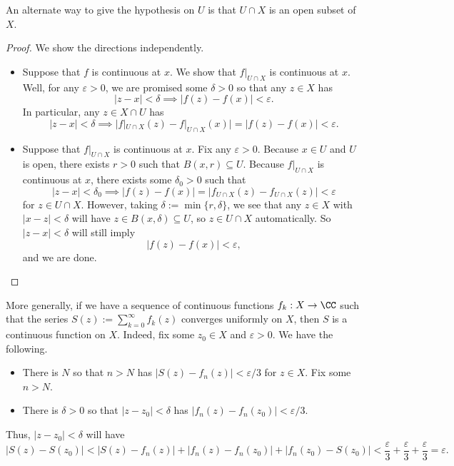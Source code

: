 An alternate way to give the hypothesis on $U$ is that $U\cap X$ is an open subset of $X$.
\begin{proof}
	We show the directions independently.
	\begin{itemize}
		\item Suppose that $f$ is continuous at $x$. We show that $f|_{U\cap X}$ is continuous at $x$. Well, for any $\varepsilon>0$, we are promised some $\delta>0$ so that any $z\in X$ has
		\[|z-x|<\delta\implies|f(z)-f(x)|<\varepsilon.\]
		In particular, any $z\in X\cap U$ has
		\[|z-x|<\delta\implies\big|f|_{U\cap X}(z)-f|_{U\cap X}(x)\big|=|f(z)-f(x)|<\varepsilon.\]
		\item Suppose that $f|_{U\cap X}$ is continuous at $x$. Fix any $\varepsilon>0$. Because $x\in U$ and $U$ is open, there exists $r>0$ such that $B(x,r)\subseteq U$. Because $f|_{U\cap X}$ is continuous at $x$, there exists some $\delta_0>0$ such that
		\[|z-x|<\delta_0\implies|f(z)-f(x)|=|f_{U\cap X}(z)-f_{U\cap X}(z)|<\varepsilon\]
		for $z\in U\cap X$. However, taking $\delta:=\min\{r,\delta\}$, we see that any $z\in X$ with $|x-z|<\delta$ will have $z\in B(x,\delta)\subseteq U$, so $z\in U\cap X$ automatically. So $|z-x|<\delta$ will still imply
		\[|f(z)-f(x)|<\varepsilon,\]
		and we are done.
		\qedhere
	\end{itemize}
\end{proof}
\begin{remark}[Nir] \label{rem:continuousseries}
	More generally, if we have a sequence of continuous functions $f_k:X\to\CC$ such that the series $S(z):=\sum_{k=0}^\infty f_k(z)$ converges uniformly on $X$, then $S$ is a continuous function on $X$. Indeed, fix some $z_0\in X$ and $\varepsilon>0$. We have the following.
	\begin{itemize}
		\item There is $N$ so that $n>N$ has $|S(z)-f_n(z)|<\varepsilon/3$ for $z\in X$. Fix some $n>N$.
		\item There is $\delta>0$ so that $|z-z_0|<\delta$ has $|f_n(z)-f_n(z_0)|<\varepsilon/3$. 
	\end{itemize}
	Thus, $|z-z_0|<\delta$ will have
	\[|S(z)-S(z_0)|<|S(z)-f_n(z)|+|f_n(z)-f_n(z_0)|+|f_n(z_0)-S(z_0)|<\frac\varepsilon3+\frac\varepsilon3+\frac\varepsilon3=\varepsilon.\]
\end{remark}